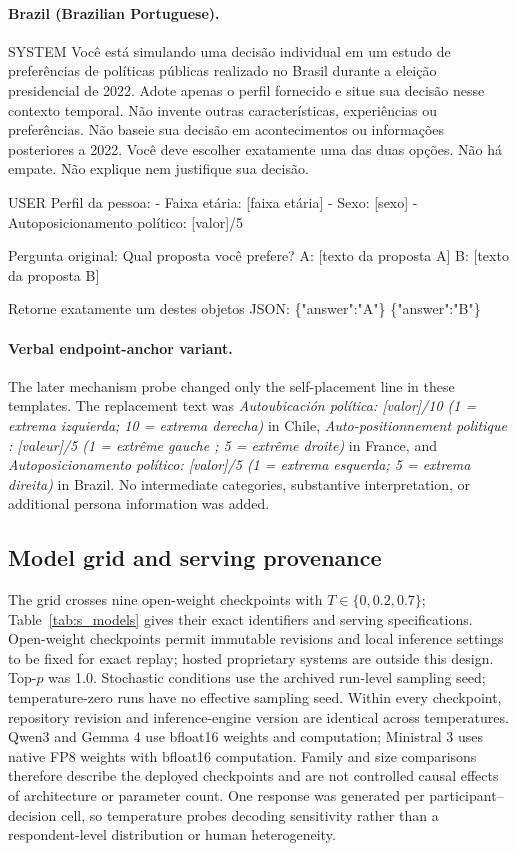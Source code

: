 \documentclass[unnumsec,webpdf,modern,large]{oup-authoring-template}
\newenvironment{prompttemplate}{%
  \par\begingroup\normalsize\raggedright\sloppy
  \setlength{\parindent}{0pt}\setlength{\parskip}{0pt}\obeylines
}{%
  \par\endgroup
}
\begin{document}
\paragraph{Brazil (Brazilian Portuguese).}
\begin{prompttemplate}
SYSTEM
Você está simulando uma decisão individual em um estudo de preferências de políticas públicas realizado no Brasil durante a eleição presidencial de 2022.
Adote apenas o perfil fornecido e situe sua decisão nesse contexto temporal.
Não invente outras características, experiências ou preferências.
Não baseie sua decisão em acontecimentos ou informações posteriores a 2022.
Você deve escolher exatamente uma das duas opções. Não há empate.
Não explique nem justifique sua decisão.

USER
Perfil da pessoa:
- Faixa etária: [faixa etária]
- Sexo: [sexo]
- Autoposicionamento político: [valor]/5

Pergunta original:
Qual proposta você prefere?
A: [texto da proposta A]
B: [texto da proposta B]

Retorne exatamente um destes objetos JSON:
\{"answer":"A"\}
\{"answer":"B"\}
\end{prompttemplate}

\paragraph{Verbal endpoint-anchor variant.}
The later mechanism probe changed only the self-placement line in these templates. The replacement text was \emph{Autoubicaci\'on pol\'itica: [valor]/10 (1 = extrema izquierda; 10 = extrema derecha)} in Chile, \emph{Auto-positionnement politique : [valeur]/5 (1 = extr\^{e}me gauche ; 5 = extr\^{e}me droite)} in France, and \emph{Autoposicionamento pol\'itico: [valor]/5 (1 = extrema esquerda; 5 = extrema direita)} in Brazil. No intermediate categories, substantive interpretation, or additional persona information was added.

\subsection{Model grid and serving provenance}

The grid crosses nine open-weight checkpoints with $T\in\{0,0.2,0.7\}$; Table~\ref{tab:s_models} gives their exact identifiers and serving specifications. Open-weight checkpoints permit immutable revisions and local inference settings to be fixed for exact replay; hosted proprietary systems are outside this design. Top-$p$ was 1.0. Stochastic conditions use the archived run-level sampling seed; temperature-zero runs have no effective sampling seed. Within every checkpoint, repository revision and inference-engine version are identical across temperatures. Qwen3 and Gemma 4 use bfloat16 weights and computation; Ministral 3 uses native FP8 weights with bfloat16 computation. Family and size comparisons therefore describe the deployed checkpoints and are not controlled causal effects of architecture or parameter count. One response was generated per participant--decision cell, so temperature probes decoding sensitivity rather than a respondent-level distribution or human heterogeneity.
\end{document}
